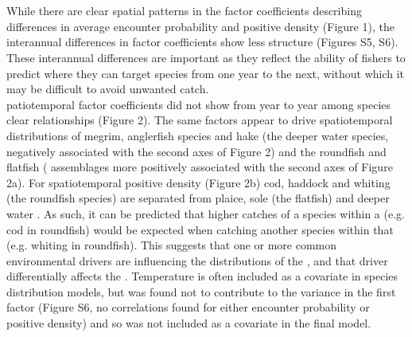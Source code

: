 \documentclass[fleqn,10pt]{wlscirep}
\begin{document}
\begin{linenumbers}
\subsection*{\\} 
While there are clear spatial patterns in the factor coefficients describing
differences in average  encounter probability and
positive density (Figure 1), the interannual differences in factor coefficients
show less structure (Figures S5, S6). These interannual differences are
important as they reflect the ability of fishers to predict where they can
target  species from one year to the next, without which
it may be difficult to 
avoid unwanted catch.\\

patiotemporal factor coefficients  did not show
 from year to year
  among
species  clear relationships
 (Figure 2).
The same factors appear to drive spatiotemporal  distributions of megrim, anglerfish species and hake (the
deeper water species,   negatively associated with the second axes of Figure 2) and
the roundfish and flatfish ( assemblages
more positively associated with the second axes of Figure 2a). For
spatiotemporal positive density (Figure 2b) cod, haddock and whiting (the
roundfish species) are separated from plaice, sole (the flatfish) and deeper
water . As such, it
can be predicted that higher catches of a species within a
 (e.g. cod in
roundfish) would be expected when catching another species within that
 (e.g.  whiting in
roundfish). This suggests that one or more common environmental drivers are
influencing the distributions of the , and that driver differentially affects the
.  Temperature is often
included as a covariate in species distribution models, but was found not to
contribute to the variance in the first factor
 (Figure S6, no correlations found for
either  encounter probability or positive density)
and so was not included as a covariate in the final model.\\


\end{linenumbers}
\end{document}
